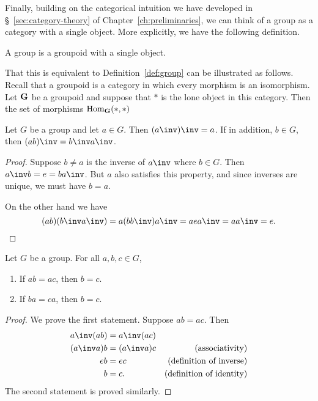 Finally, building on the categorical intuition we have developed in
\S~\ref{sec:category-theory} of Chapter~\ref{ch:preliminaries}, we can think of
a group as a category with a single object. More explicitly, we have the
following definition.

\begin{definition}
    A group is a groupoid with a single object.
\end{definition}

That this is equivalent to Definition~\ref{def:group} can be illustrated as
follows. Recall that a groupoid is a category in which every morphism is an
isomorphism. Let \(\mathbf{G}\) be a groupoid and suppose that \(*\) is the lone
object in this category. Then the set of morphisms \(\operatorname{Hom}_{\mathbf{G}}(*, *)\)

\begin{theorem}
    \label{thm:group-inverses}
    Let \(G\) be a group and let \(a \in G\). Then \((a\inv)\inv = a\). If in
    addition, \(b \in G\), then \((ab)\inv = b\inv a\inv\).
\end{theorem}

\begin{proof}
    Suppose \(b \neq a\) is the inverse of \(a\inv\) where \(b \in G\). Then
    \(a\inv b = e = ba\inv\). But \(a\) also satisfies this property, and since
    inverses are unique, we must have \(b = a\).

    On the other hand we have
    \[
        (ab)(b\inv a\inv) = a(bb\inv)a\inv = aea\inv = aa\inv = e.
    \]
\end{proof}


\begin{theorem}
    Let \(G\) be a group. For all \(a, b, c \in G\),
    \begin{enumerate}
        \item If \(ab = ac\), then \(b = c\).
        \item If \(ba = ca\), then \(b = c\).
    \end{enumerate}
\end{theorem}

\begin{proof}
    We prove the first statement. Suppose \(ab = ac\). Then
    \begin{align*}
        a\inv(ab) &= a\inv(ac) &\\
        (a\inv a)b &= (a\inv a)c &\text{(associativity)}\\
        eb &= ec &\text{(definition of inverse)}\\
        b &= c. &\text{(definition of identity)}
    \end{align*}
    The second statement is proved similarly.
\end{proof}

